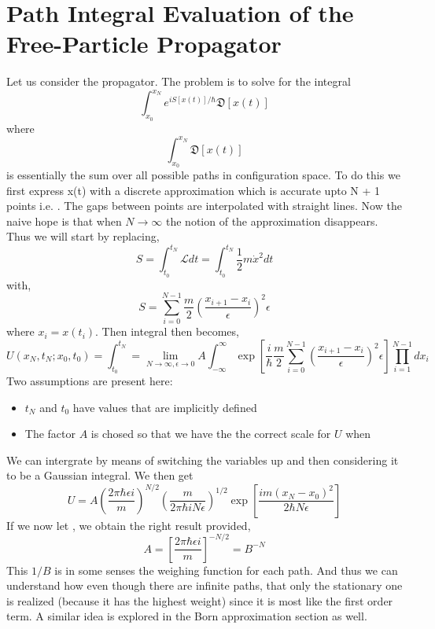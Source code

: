 \section{Path Integral Evaluation of the Free-Particle Propagator}
Let us consider the propagator. The problem is to solve for the integral
\begin{equation}
\int^{x_{N}}_{x_{0}}e^{iS[x(t)]/ \hbar}\mathfrak{D}[x(t)]
\end{equation}
where
$$\int^{x_{N}}_{x_{0}}\mathfrak{D}[x(t)]$$
is essentially the sum over all possible paths in configuration space. To do this we first express x(t) with a discrete approximation which is accurate upto N + 1 points i.e. . The gaps between points are interpolated with straight lines. Now the naive hope is that when $N \rightarrow \infty$ the notion of the approximation disappears. Thus we will start by replacing,
\begin{equation}
S = \int_{t_{0}}^{t_{N}}\mathcal{L} dt = \int_{t_{0}}^{t_{N}} \frac{1}{2}m\dot{x}^{2} dt
\end{equation}
with,
\begin{equation}
	S = \sum_{i=0}^{N-1} \frac{m}{2}{\left(\frac{x_{i+1} - x_{i}}{\epsilon}\right)}^{2}\epsilon
\end{equation}
where $x_{i} = x(t_{i})$. Then integral then becomes,
\begin{equation}
U(x_{N},t_{N};x_{0},t_{0}) = \int_{t_{0}}^{t_{N}} = \lim_{N \rightarrow \infty, \epsilon \rightarrow 0} A \int_{-\infty}^{\infty} \exp \left[\frac{i}{\hbar} \frac{m}{2} \sum_{i=0}^{N-1}  {\left(\frac{x_{i+1} - x_{i}}{\epsilon}\right)}^{2}\epsilon \right] \prod_{i=1}^{N-1}dx_{i}
\end{equation}
Two assumptions are present here:
\begin{itemize}
\item $t_{N}$ and $t_{0}$ have values that are implicitly defined
\item The factor $A$ is chosed so that we have the the correct scale for $U$ when 
\end{itemize}
We can intergrate by means of switching the variables up and then considering it to be a Gaussian integral. We then get
\begin{equation}
U = A {\left(\frac{2 \pi \hbar \epsilon i}{m}\right)}^{N/2} {\left(\frac{m}{2 \pi \hbar i N \epsilon}\right)}^{1/2} \exp \left[\frac{im{(x_{N}-x_{0})}^{2}}{2 \hbar N \epsilon}\right]
\end{equation}
If we now let , we obtain the right result provided,
$$A = {\left[\frac{2 \pi \hbar \epsilon i}{m}\right]}^{-N/2} = B^{-N}$$
This $1/B$ is in some senses the weighing function for each path. And thus we can understand how even though there are infinite paths, that only the stationary one is realized (because it has the highest weight) since it is most like the first order term. A similar idea is explored in the Born approximation section as well.
